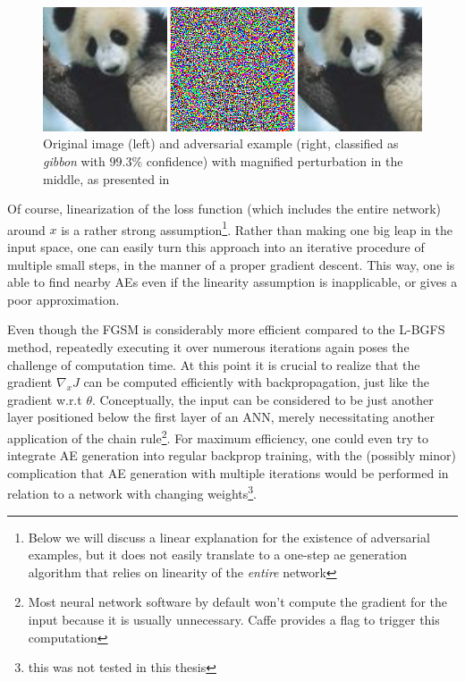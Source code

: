 \documentclass[11pt, a4paper]{article}
\begin{document}
\begin{figure}[htp]
	\centering
	\includegraphics[width=\textwidth]{images/harnessing_ae.png}
	\caption{Original image (left) and adversarial example (right, classified as \emph{gibbon} with $99.3\%$ confidence) with magnified perturbation in the middle, as presented in \cite{explaining-and-harnessing-adversarial-examples}}
	\label{fig:harnessing-ae}
\end{figure}

Of course, linearization of the loss function (which includes the entire network) around $x$ is a rather strong assumption\footnote{Below we will discuss a linear explanation for the existence of adversarial examples, but it does not easily translate to a one-step ae generation algorithm that relies on linearity of the \emph{entire} network}. Rather than making one big leap in the input space, one can easily turn this approach into an iterative procedure of multiple small steps, in the manner of a proper gradient descent. This way, one is able to find nearby AEs even if the linearity assumption is inapplicable, or gives a poor approximation.


Even though the FGSM is considerably more efficient compared to the L-BGFS method, repeatedly executing it over numerous iterations again poses the challenge of computation time. At this point it is crucial to realize that the gradient $\nabla_x J$ can be computed efficiently with backpropagation, just like the gradient w.r.t $\theta$. Conceptually, the input can be considered to be just another layer positioned below the first layer of an ANN, merely necessitating another application of the chain rule\footnote{Most neural network software by default won't compute the gradient for the input because it is usually unnecessary. Caffe provides a flag to trigger this computation}. For maximum efficiency, one could even try to integrate AE generation into regular backprop training, with the (possibly minor) complication that AE generation with multiple iterations would be performed in relation to a network with changing weights\footnote{this was not tested in this thesis}.
\end{document}
